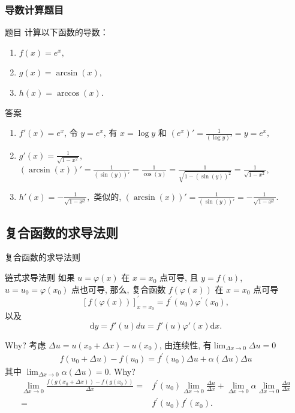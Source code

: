 \documentclass[
10pt,
aspectratio=43,
]{beamer}
\begin{document}
\begin{frame}
	\frametitle{导数计算题目}
	\begin{exampleblock}{题目}
		计算以下函数的导数：
		\begin{enumerate}
			\item $f(x) = e^x,$
			\item $g(x) = \arcsin(x),$
			\item $h(x) = \arccos(x).$
		\end{enumerate}
	\end{exampleblock}

	\pause

	\begin{exampleblock}{答案}
		\begin{enumerate}
			\item $f'(x) = e^x$, 令 $y=e^x$, 有 $x=\log y$ 和 $(e^x)'=\displaystyle\frac{1}{(\log y)'}=y=e^x,$
			\item $g'(x) = \displaystyle\frac{1}{\sqrt{1-x^2}},$ $(\arcsin(x))'=\displaystyle\frac{1}{(\sin (y))'}=\frac{1}{\cos(y)}=\frac{1}{\sqrt{1-(\sin(y))^2}}=\frac{1}{\sqrt{1-x^2}},$
			\item $h'(x) = -\displaystyle\frac{1}{\sqrt{1-x^2}},$ 类似的, $(\arcsin(x))'=\displaystyle\frac{1}{(\sin (y))'}=-\frac{1}{\sqrt{1-x^2}}.$
		\end{enumerate}
	\end{exampleblock}
\end{frame}


\subsection{复合函数的求导法则}
\begin{frame}{复合函数的求导法则}
	\begin{block}{链式求导法则}
		如果 $u=\varphi(x)$ 在 $x=x_0$ 点可导, 且 $y=f(u)$, $u=u_0=\varphi\left(x_0\right)$ 点也可导, 那么, 复合函数 $f(\varphi(x))$ 在 $x=x_0$ 点可导
		\[
			[f(\varphi(x))]_{x=x_0}^{\prime}=f^{\prime}\left(u_0\right) \varphi^{\prime}\left(x_0\right),
		\]
		以及
		\[
			\mathrm{d}y=f'(u)du=f'(u)\varphi'(x)\mathrm{d}x.
		\]
	\end{block}
	Why? \pause 考虑 $\Delta u = u(x_0+\Delta x) - u(x_0)$, \pause 由连续性, 有$\lim_{\Delta x\to0}\Delta u=0$ \pause
	\begin{align*}
		f\left(u_0+\Delta u\right)-f\left(u_0\right)=f^{\prime}\left(u_0\right) \Delta u+\alpha(\Delta u) \Delta u
	\end{align*}
	其中 $\lim_{\Delta x\to0}\alpha(\Delta u)=0$. \pause Why? \pause
	\begin{align*}
		\lim _{\Delta x \rightarrow 0} \frac{f\left(g\left(x_0+\Delta x\right)\right)-f\left(g\left(x_0\right)\right)}{\Delta x}= & f^{\prime}\left(u_0\right) \lim _{\Delta x \rightarrow 0} \frac{\Delta u}{\Delta x}+\lim _{\Delta x \rightarrow 0} \alpha \lim _{\Delta x \rightarrow 0} \frac{\Delta u}{\Delta x} \\
		=                                                                                                                         & f^{\prime}\left(u_0\right)f^{\prime}\left(x_0\right).
	\end{align*}
\end{frame}
\end{document}
